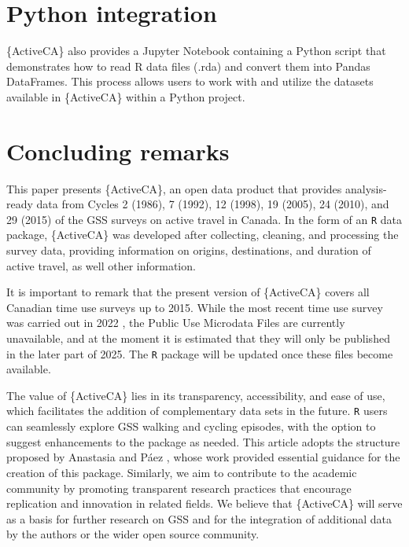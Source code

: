 \documentclass[Royal,times,sageh]{sagej}
\begin{document}
\hypertarget{python-integration}{%
\section{Python integration}\label{python-integration}}

\{ActiveCA\} also provides a Jupyter Notebook containing a Python script
that demonstrates how to read R data files (.rda) and convert them into
Pandas DataFrames. This process allows users to work with and utilize
the datasets available in \{ActiveCA\} within a Python project.

\hypertarget{concluding-remarks}{%
\section{Concluding remarks}\label{concluding-remarks}}

This paper presents \{ActiveCA\}, an open data product that provides
analysis-ready data from Cycles 2 (1986), 7 (1992), 12 (1998), 19
(2005), 24 (2010), and 29 (2015) of the GSS surveys on active travel in
Canada. In the form of an \texttt{R} data package, \{ActiveCA\} was
developed after collecting, cleaning, and processing the survey data,
providing information on origins, destinations, and duration of active
travel, as well other information.

It is important to remark that the present version of \{ActiveCA\}
covers all Canadian time use surveys up to 2015. While the most recent
time use survey was carried out in 2022 \citep{wray2024}, the Public Use
Microdata Files are currently unavailable, and at the moment it is
estimated that they will only be published in the later part of 2025.
The \texttt{R} package will be updated once these files become
available.

The value of \{ActiveCA\} lies in its transparency, accessibility, and
ease of use, which facilitates the addition of complementary data sets
in the future. \texttt{R} users can seamlessly explore GSS walking and
cycling episodes, with the option to suggest enhancements to the package
as needed. This article adopts the structure proposed by Anastasia and
Páez \citeyearpar{soukhov2023}, whose work provided essential guidance
for the creation of this package. Similarly, we aim to contribute to the
academic community by promoting transparent research practices that
encourage replication and innovation in related fields. We believe that
\{ActiveCA\} will serve as a basis for further research on GSS and for
the integration of additional data by the authors or the wider open
source community.
\end{document}
